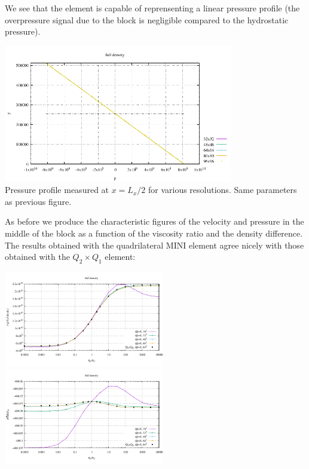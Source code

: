 We see that the element is capable of reprensenting a linear pressure profile
(the overpressure signal due to the block is negligible compared to the 
hydrostatic pressure).

\begin{center}
\includegraphics[width=10cm]{python_codes/fieldstone_72/results/block/full/plines}\\
{\captionfont Pressure profile measured at $x=L_x/2$ for various resolutions. Same parameters
as previous figure.}
\end{center}

As before we produce the characteristic figures of the velocity and pressure in the middle of the 
block as a function of the viscosity ratio and the density difference. The results obtained 
with the quadrilateral MINI element agree nicely with those obtained with the $Q_2\times Q_1$ element:
 
\begin{center}
\includegraphics[width=7cm]{python_codes/fieldstone_72/results/block/full/results_v}
\includegraphics[width=7cm]{python_codes/fieldstone_72/results/block/full/results_p}
\end{center}


